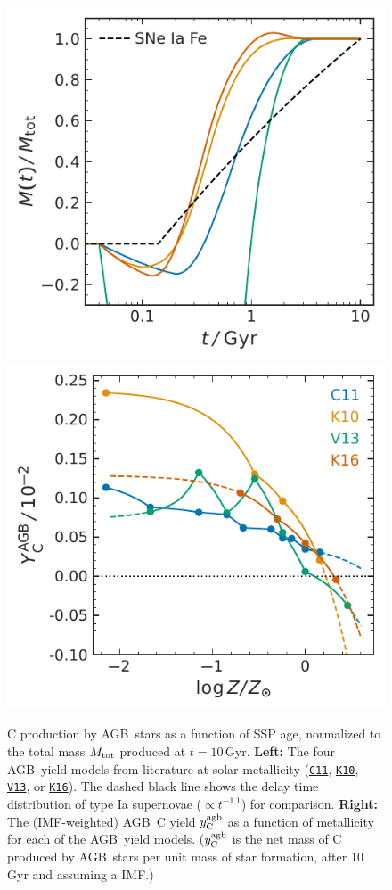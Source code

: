 \documentclass[fleqn,usenatbib]{mnras}
\newcommand{\cxi}{\texttt{\hyperlink{C11}{C11}}}
\newcommand{\kx}{\texttt{\hyperlink{K10}{K10}}}
\newcommand{\kxvi}{\texttt{\hyperlink{K16}{K16}}}
\newcommand{\vxiii}{\texttt{\hyperlink{V13}{V13}}}
\newcommand{\agb}{AGB}
\newcommand{\ssp}{SSP}
\newcommand{\imf}{IMF}
\newcommand{\Ycagb}{\ensuremath{y_{\rm C}^{\rm agb}}}
\begin{document}
\begin{figure}
    \centering
    \includegraphics{y_agb_vs_t.pdf}
    \includegraphics{y_agb_vs_z.pdf}

    \caption[]{ C production by \agb\ stars as a function of \ssp{} age, normalized to the total mass $M_{\rm tot}$ produced at $t=10$\,Gyr. \textbf{Left:} The four \agb\ yield models from literature at solar metallicity (\cxi, \kx{}, \vxiii{}, or \kxvi{}). The dashed black line shows the delay time distribution of type Ia supernovae ($\propto t^{-1.1}$) for comparison. \textbf{Right:} The (\imf-weighted) \agb\ C yield $\Ycagb$ as a function of metallicity for each of the \agb\ yield models. ($\Ycagb$ is the net mass of C produced by \agb\ stars per unit mass of star formation, after 10\,Gyr and assuming a \citealt{kroupa01} \imf.) }

    \label{fig:agb-ssp}

\end{figure}
\end{document}
